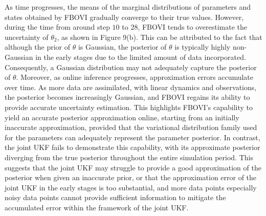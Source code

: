 \documentclass[preprint,3p,times]{elsarticle}
\begin{document}
As time progresses, the means of the marginal distributions of parameters and states obtained by FBOVI gradually converge to their true values. However, during the time from around step $10$ to $28$, FBOVI tends to overestimate the uncertainty of $\theta_2$, as shown in Figure 9(b). This can be attributed to the fact that although the prior of $\theta$ is Gaussian, the posterior of $\theta$ is typically highly non-Gaussian in the early stages due to the limited amount of data incorporated. Consequently, a Gaussian distribution may not adequately capture the posterior of $\theta$. Moreover, as online inference progresses, approximation errors accumulate over time. As more data are assimilated, with linear dynamics and observations, the posterior becomes increasingly Gaussian, and FBOVI regains its ability to provide accurate uncertainty estimation. This highlights FBOVI's capability to yield an accurate posterior approximation online, starting from an initially inaccurate approximation, provided that the variational distribution family used for the parameters can adequately represent the parameter posterior. In contrast, the joint UKF fails to demonstrate this capability, with its approximate posterior diverging from the true posterior throughout the entire simulation period. This suggests that the joint UKF may struggle to provide a good approximation of the posterior when given an inaccurate prior, or that the approximation error of the joint UKF in the early stages is too substantial, and more data points especially noisy data points cannot provide sufficient information to mitigate the accumulated error within the framework of the joint UKF. 
\end{document}
